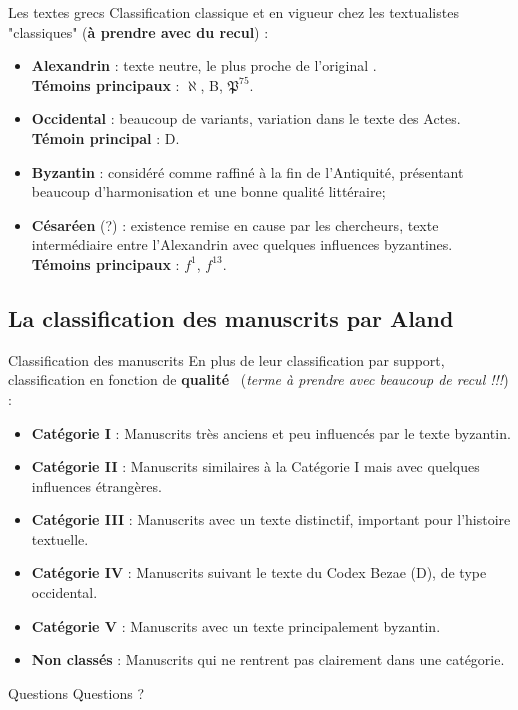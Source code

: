 \documentclass[11pt]{beamer}
\begin{document}
\begin{frame}{Les textes grecs}
    Classification classique et en vigueur chez les textualistes "classiques" (\textbf{à prendre avec du recul}) :

    \begin{itemize}
        \item \textbf{Alexandrin} : texte neutre, le plus proche de \og l'original \fg.\\ \textbf{Témoins principaux} : $\aleph$, B, $\mathfrak{P}^{75}$.
        \item \textbf{Occidental} : beaucoup de variants, variation dans le texte des Actes. \\
        \textbf{Témoin principal} : D.
        \item \textbf{Byzantin} : considéré comme raffiné à la fin de l'Antiquité, présentant beaucoup d'harmonisation et une bonne qualité littéraire;
        \item \textbf{Césaréen} (?) : existence remise en cause par les chercheurs, texte intermédiaire entre l'Alexandrin avec quelques influences byzantines. \\
        \textbf{Témoins principaux} : $f^1$, $f^{13}$.
    \end{itemize}
\end{frame}

\subsection{La classification des manuscrits par Aland}

\begin{frame}{Classification des manuscrits}
En plus de leur classification par support, classification en fonction de \og \textbf{qualité} \fg\ (\textit{terme à prendre avec beaucoup de recul !!!}) :
\pause
\begin{itemize}
\item \textbf{Catégorie I} : Manuscrits très anciens et peu influencés par le texte byzantin.
\pause

\item \textbf{Catégorie II} : Manuscrits similaires à la Catégorie I mais avec quelques influences étrangères.
\pause

\item \textbf{Catégorie III} : Manuscrits avec un texte distinctif, important pour l'histoire textuelle.
\pause

\item \textbf{Catégorie IV} : Manuscrits suivant le texte du Codex Bezae (D), de type occidental.
\pause

\item \textbf{Catégorie V} : Manuscrits avec un texte principalement byzantin.
\pause

\item \textbf{Non classés} : Manuscrits qui ne rentrent pas clairement dans une catégorie.
\end{itemize}
\end{frame}

\begin{frame}{Questions}
    Questions ?
\end{frame}
\end{document}
